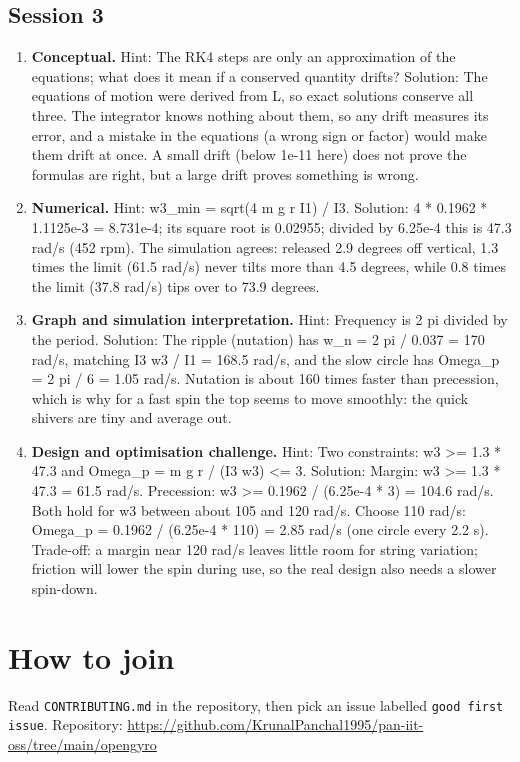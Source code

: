 \documentclass[11pt,a4paper]{article}
\begin{document}
\subsection*{Session 3}
\begin{enumerate}[nosep]
\item \textbf{Conceptual.} Hint: The RK4 steps are only an approximation of the equations; what does it mean if a conserved quantity drifts? Solution: The equations of motion were derived from L, so exact solutions conserve all three. The integrator knows nothing about them, so any drift measures its error, and a mistake in the equations (a wrong sign or factor) would make them drift at once. A small drift (below 1e-11 here) does not prove the formulas are right, but a large drift proves something is wrong.
\item \textbf{Numerical.} Hint: w3\_min = sqrt(4 m g r I1) / I3. Solution: 4 * 0.1962 * 1.1125e-3 = 8.731e-4; its square root is 0.02955; divided by 6.25e-4 this is 47.3 rad/s (452 rpm). The simulation agrees: released 2.9 degrees off vertical, 1.3 times the limit (61.5 rad/s) never tilts more than 4.5 degrees, while 0.8 times the limit (37.8 rad/s) tips over to 73.9 degrees.
\item \textbf{Graph and simulation interpretation.} Hint: Frequency is 2 pi divided by the period. Solution: The ripple (nutation) has w\_n = 2 pi / 0.037 = 170 rad/s, matching I3 w3 / I1 = 168.5 rad/s, and the slow circle has Omega\_p = 2 pi / 6 = 1.05 rad/s. Nutation is about 160 times faster than precession, which is why for a fast spin the top seems to move smoothly: the quick shivers are tiny and average out.
\item \textbf{Design and optimisation challenge.} Hint: Two constraints: w3 \textgreater{}= 1.3 * 47.3 and Omega\_p = m g r / (I3 w3) \textless{}= 3. Solution: Margin: w3 \textgreater{}= 1.3 * 47.3 = 61.5 rad/s. Precession: w3 \textgreater{}= 0.1962 / (6.25e-4 * 3) = 104.6 rad/s. Both hold for w3 between about 105 and 120 rad/s. Choose 110 rad/s: Omega\_p = 0.1962 / (6.25e-4 * 110) = 2.85 rad/s (one circle every 2.2 s). Trade-off: a margin near 120 rad/s leaves little room for string variation; friction will lower the spin during use, so the real design also needs a slower spin-down.
\end{enumerate}

\section{How to join}
Read \texttt{CONTRIBUTING.md} in the repository, then pick an issue labelled \texttt{good first issue}. Repository: \url{https://github.com/KrunalPanchal1995/pan-iit-oss/tree/main/opengyro}
\end{document}
